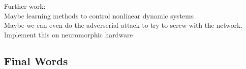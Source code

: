 Further work:\\
Maybe learning methods to control nonlinear dynamic systems\\
Maybe we can even do the adverserial attack to try to screw with the network.\\
Implement this on neuromorphic hardware\\

\subsection{Final Words}
\listoftodos






